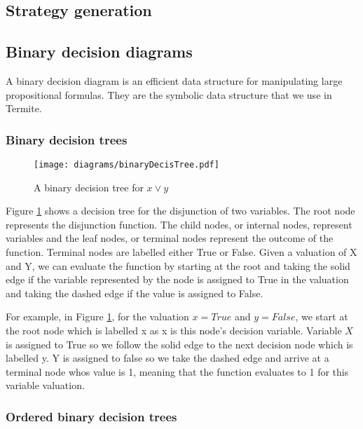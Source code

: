 \subsection{Strategy generation}


\subsection{Binary decision diagrams}

A binary decision diagram is an efficient data structure for manipulating large propositional formulas. They are the symbolic data structure that we use in Termite.

\subsubsection{Binary decision trees}

\begin{figure}[t]
\centering
\texttt{[image: diagrams/binaryDecisTree.pdf]}
\caption{A binary decision tree for $x \vee y$}
\label{fig:decis_tree}
\end{figure}

Figure \ref{fig:decis_tree} shows a decision tree for the disjunction of two variables. The root node represents the disjunction function. The child nodes, or internal nodes, represent variables and the leaf nodes, or terminal nodes represent the outcome of the function. Terminal nodes are labelled either True or False. Given a valuation of X and Y, we can evaluate the function by starting at the root and taking the solid edge if the variable represented by the node is assigned to True in the valuation and taking the dashed edge if the value is assigned to False. 

For example, in Figure \ref{fig:decis_tree}, for the valuation $x=True$ and $y=False$, we start at the root node which is labelled x as x is this node's decision variable. Variable $X$ is assigned to True so we follow the solid edge to the next decision node which is labelled y. Y is assigned to false so we take the dashed edge and arrive at a terminal node whos value is 1, meaning that the function evaluates to 1 for this variable valuation.

\subsubsection{Ordered binary decision trees}

